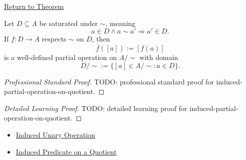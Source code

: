\newpage
{}
\label{prf:induced-partial-operation-on-quotient}

\begin{remark*}[Return]
\hyperref[thm:induced-partial-operation-on-quotient]{Return to Theorem}
\end{remark*}

\begin{theorem*}
Let $D\subseteq A$ be saturated under $\sim$, meaning
\[
a\in D\land a\sim a'\Longrightarrow a'\in D.
\]
If $f:D\to A$ respects $\sim$ on $D$, then
\[
\overline{f}([a]):=[f(a)]
\]
is a well-defined partial operation on $A/{\sim}$ with domain
\[
D/{\sim}:=\{[a]\in A/{\sim}:a\in D\}.
\]
\end{theorem*}

\begin{proof}[Professional Standard Proof]
\LRAProofBodyStart
TODO: professional standard proof for induced-partial-operation-on-quotient.
\end{proof}

\begin{proof}[Detailed Learning Proof]
\LRAProofBodyStart
TODO: detailed learning proof for induced-partial-operation-on-quotient.
\end{proof}

\begin{remark*}
\end{remark*}

\begin{dependencies}
\begin{itemize}
  \item \hyperref[thm:induced-unary-operation-on-quotient]{Induced Unary Operation}
  \item \hyperref[thm:induced-predicate-on-quotient]{Induced Predicate on a Quotient}
\end{itemize}
\end{dependencies}

\clearpage
